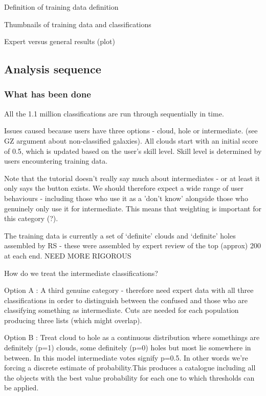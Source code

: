 \documentclass[a4,useAMS,usenatbib]{mn2e}
\begin{document}
Definition of training data definition

Thumbnails of training data and classifications

Expert versus general results (plot)

\subsection{Analysis sequence}

\subsubsection{What has been done}

All the 1.1 million classifications are run through sequentially in time.

Issues caused because users have three options - cloud, hole or intermediate. (see GZ argument about non-classified galaxies). All clouds start with an initial score of 0.5, which is updated based on the user's skill level. Skill level is determined by users encountering training data. 

Note that the tutorial doesn't really say much about intermediates - or at least it only says the button exists. We should therefore expect a wide range of user behaviours - including those who use it as a 'don't know' alongside those who genuinely only use it for intermediate. This means that weighting is important for this category (?). 

The training data is currently a set of `definite' clouds and `definite' holes assembled by RS - these were assembled by expert review of the top (approx) 200 at each end. NEED MORE RIGOROUS

How do we treat the intermediate classifications? 

	Option A : A third genuine category - therefore need expert data with all three classifications in order to distinguish between the confused and those who are classifying something as intermediate. Cuts are needed for each population producing three lists (which might overlap). 
	
	Option B : Treat cloud to hole as a continuous distribution where somethings are definitely (p=1) clouds, some definitely (p=0) holes but most lie somewhere in between. In this model intermediate votes signify p=0.5. In other words we're forcing a discrete estimate of probability.This produces a catalogue including all the objects with the best value probability for each one to which thresholds can be applied. 
	
\end{document}
